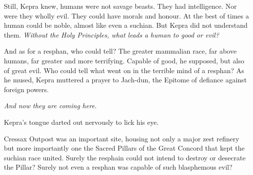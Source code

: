 \documentclass
  [a4paper,
   12pt,
   oneside
  ]%
  {article}
\begin{document}
Still, Kepra knew, humans were not savage beasts. They had intelligence. Nor were they wholly evil. They could have morals and honour. At the best of times a human could be noble, almost like even a suchian. But Kepra did not understand them. 
\emph{Without the Holy Principles, what leads a human to good or evil?} 

And as for a resphan, who could tell? The greater mammalian race, far above humans, far greater and more terrifying. Capable of good, he supposed, but also of great evil. Who could tell what went on in the terrible mind of a resphan? As he mused, Kepra muttered a prayer to Jach-dun, the Epitome of defiance against foreign powers.

\emph{And now they are coming here.} 

Kepra’s tongue darted out nervously to lick his eye.



Cressax Outpost was an important site, housing not only a major zest refinery but more importantly one the Sacred Pillars of the Great Concord that kept the suchian race united. Surely the resphain could not intend to destroy or desecrate the Pillar? Surely not even a resphan was capable of such blasphemous evil? 
\end{document}
